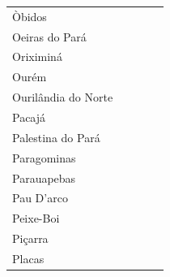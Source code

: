 \begin{table}[!htb]
{\begin{tabular}{l|c|c|c|c}
   Òbidos                 &             &             &             &    \\
   Oeiras do Pará         &             &             &             &    \\
   Oriximiná              &             &             &             &    \\
   Ourém                  &             &             &             &    \\
   Ourilândia do Norte    &             &             &             &    \\
   Pacajá                 &             &             &             &    \\
   Palestina do Pará      &             &             &             &    \\
   Paragominas            &             &             &             &    \\
   Parauapebas            &             &             &             &    \\
   Pau D'arco             &             &             &             &    \\
   Peixe-Boi              &             &             &             &    \\
   Piçarra                &             &             &             &    \\
   Placas                 &             &             &             &    \\
\end{tabular}}
\end{table}


